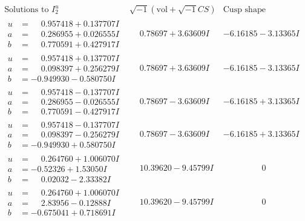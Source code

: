 \documentclass[1p]{elsarticle_modified}
\theoremstyle{definition}
\newcommand{\I}{\sqrt{-1}}
\begin{document}
$$\begin{array}{c|c|c}  
\text{Solutions to }I^u_{2}& \I (\text{vol} + \sqrt{-1}CS) & \text{Cusp shape}\\
 \hline 
\begin{aligned}
u &= \phantom{-}0.957418 + 0.137707 I \\
a &= \phantom{-}0.286955 + 0.026555 I \\
b &= \phantom{-}0.770591 + 0.427917 I\end{aligned}
 & \phantom{-}0.78697 + 3.63609 I & -6.16185 - 3.13365 I \\ \hline\begin{aligned}
u &= \phantom{-}0.957418 + 0.137707 I \\
a &= \phantom{-}0.098397 + 0.256279 I \\
b &= -0.949930 - 0.580750 I\end{aligned}
 & \phantom{-}0.78697 + 3.63609 I & -6.16185 - 3.13365 I \\ \hline\begin{aligned}
u &= \phantom{-}0.957418 - 0.137707 I \\
a &= \phantom{-}0.286955 - 0.026555 I \\
b &= \phantom{-}0.770591 - 0.427917 I\end{aligned}
 & \phantom{-}0.78697 - 3.63609 I & -6.16185 + 3.13365 I \\ \hline\begin{aligned}
u &= \phantom{-}0.957418 - 0.137707 I \\
a &= \phantom{-}0.098397 - 0.256279 I \\
b &= -0.949930 + 0.580750 I\end{aligned}
 & \phantom{-}0.78697 - 3.63609 I & -6.16185 + 3.13365 I \\ \hline\begin{aligned}
u &= \phantom{-}0.264760 + 1.006070 I \\
a &= -0.52326 + 1.53050 I \\
b &= \phantom{-}0.02032 - 2.33382 I\end{aligned}
 & \phantom{-}10.39620 - 9.45799 I & \phantom{-0.000000 } 0 \\ \hline\begin{aligned}
u &= \phantom{-}0.264760 + 1.006070 I \\
a &= \phantom{-}2.83956 - 0.12888 I \\
b &= -0.675041 + 0.718691 I\end{aligned}
 & \phantom{-}10.39620 - 9.45799 I & \phantom{-0.000000 } 0 \\ \hline\begin{aligned}

\end{aligned}
\end{array}$$
\end{document}
